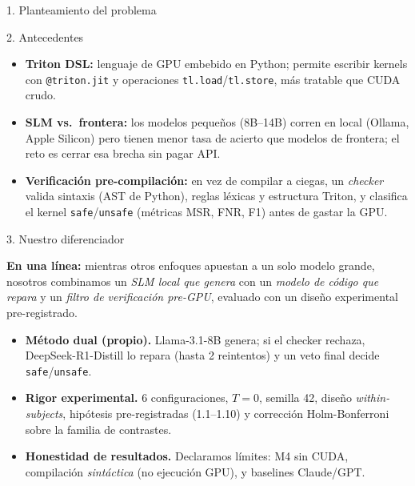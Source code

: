 \documentclass[final]{beamer}
\newlength{\colwidth}
\begin{document}
\begin{frame}[t]
\begin{columns}[t]
\begin{column}{\colwidth}
\begin{block}{1. Planteamiento del problema}
  \end{block}

  \begin{block}{2. Antecedentes}

    \begin{itemize}
      \item \textbf{Triton DSL:} lenguaje de GPU embebido en Python; permite
        escribir kernels con \texttt{@triton.jit} y operaciones
        \texttt{tl.load}/\texttt{tl.store}, más tratable que CUDA crudo.
      \item \textbf{SLM vs.\ frontera:} los modelos pequeños (8B–14B) corren en
        local (Ollama, Apple Silicon) pero tienen menor tasa de acierto que
        modelos de frontera; el reto es cerrar esa brecha sin pagar API.
      \item \textbf{Verificación pre-compilación:} en vez de compilar a ciegas,
        un \emph{checker} valida sintaxis (AST de Python), reglas léxicas y
        estructura Triton, y clasifica el kernel \texttt{safe}/\texttt{unsafe}
        (métricas MSR, FNR, F1) antes de gastar la GPU.
    \end{itemize}

  \end{block}

  \begin{alertblock}{3. Nuestro diferenciador}

    \textbf{En una línea:} mientras otros enfoques apuestan a un solo modelo
    grande, nosotros combinamos un \emph{SLM local que genera} con un
    \emph{modelo de código que repara} y un \emph{filtro de verificación
    pre-GPU}, evaluado con un diseño experimental pre-registrado.

    \begin{itemize}
      \item \textbf{Método dual (propio).} Llama-3.1-8B genera; si el checker
        rechaza, DeepSeek-R1-Distill lo repara (hasta 2 reintentos) y un veto
        final decide \texttt{safe}/\texttt{unsafe}.
      \item \textbf{Rigor experimental.} 6 configuraciones, $T=0$, semilla 42,
        diseño \emph{within-subjects}, hipótesis pre-registradas (1.1–1.10) y
        corrección Holm-Bonferroni sobre la familia de contrastes.
      \item \textbf{Honestidad de resultados.} Declaramos límites: M4 sin CUDA,
        compilación \emph{sintáctica} (no ejecución GPU), y baselines
        Claude/GPT.
    \end{itemize}


\end{alertblock}
\end{column}
\end{columns}
\end{frame}
\end{document}
